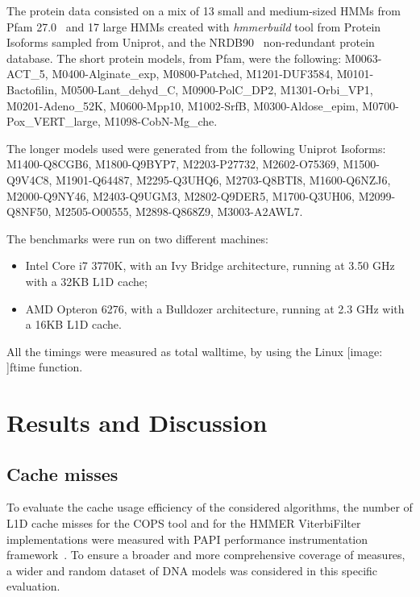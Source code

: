 \documentclass{bmcart}
\def\texttt{[image: ]}
\begin{document}
 The protein data
consisted on a mix of 13 small and medium-sized \acp{HMM} from Pfam
27.0~\cite{Pfam} and 17 large \acp{HMM} created with
\textit{hmmerbuild} tool from Protein Isoforms sampled from Uniprot,
and the NRDB90~\cite{nrdb90} non-redundant protein database. The short
protein models, from Pfam, were the following:
M0063-ACT\_5, M0400-Alginate\_exp, M0800-Patched, M1201-DUF3584,
M0101-Bactofilin, M0500-Lant\_dehyd\_C, M0900-PolC\_DP2, M1301-Orbi\_VP1,
M0201-Adeno\_52K, M0600-Mpp10, M1002-SrfB, 					
M0300-Aldose\_epim, M0700-Pox\_VERT\_large, M1098-CobN-Mg\_che. 				

The longer models used were generated from the following Uniprot
Isoforms: 
M1400-Q8CGB6, M1800-Q9BYP7, M2203-P27732, M2602-O75369,
M1500-Q9V4C8, M1901-Q64487, M2295-Q3UHQ6, M2703-Q8BTI8,
M1600-Q6NZJ6, M2000-Q9NY46, M2403-Q9UGM3, M2802-Q9DER5,
M1700-Q3UH06, M2099-Q8NF50, M2505-O00555, M2898-Q868Z9,
M3003-A2AWL7.


The benchmarks were run on two different machines:
\begin{itemize}
\item Intel Core i7 3770K, with an Ivy Bridge architecture, running at 3.50 GHz with a 32KB L1D cache;
\item AMD Opteron 6276, with a Bulldozer architecture, running at 2.3 GHz with a 16KB L1D cache.
\end{itemize}
All the timings were measured as total walltime, by using the Linux \texttt{ftime} function.

\section*{Results and Discussion}

\subsection*{Cache misses}

To evaluate the cache usage efficiency of the considered algorithms, the number of \ac{L1D} cache misses for the \ac{COPS} tool and for the HMMER ViterbiFilter implementations were measured with PAPI performance instrumentation framework~\cite{papi}. To ensure a broader and more comprehensive coverage of measures, a wider and random dataset of DNA models was considered in this specific evaluation.
\end{document}
